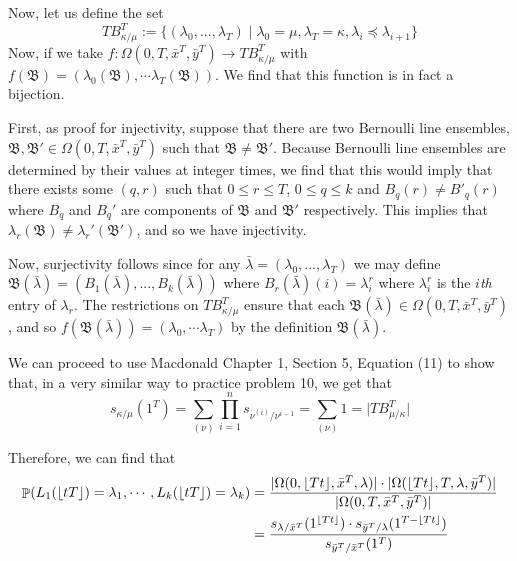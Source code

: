 \documentclass[12pt]{article}
\DeclareMathOperator{\pr}{\mathbb{P}}
\DeclarePairedDelimiter\floor{\lfloor}{\rfloor}
\begin{document}
Now, let us define the set 
\[TB_{\kappa/\mu}^T:=\{(\lambda_0,...,\lambda_T)\mid \lambda_0=\mu, \lambda_T=\kappa, \lambda_i\preceq\lambda_{i+1}\}\] 
Now, if we take $f:\Omega(0,T,\bar x^T, \bar y ^T)\to TB_{\kappa/\mu}^T$ with $f(\mathfrak{B})= (\lambda_0(\mathfrak{B}),\cdots \lambda_T(\mathfrak{B}))$. We find that this function is in fact a bijection. 

First, as proof for injectivity, suppose that there are two Bernoulli line ensembles, $\mathfrak{B}, \mathfrak{B}'\in \Omega(0,T,\bar x^T, \bar y ^T)$ such that $\mathfrak{B}\neq \mathfrak{B'}$.
Because Bernoulli line ensembles are determined by their values at integer times, we find that this would imply that there exists some $(q,r)$ such that $0\leq r\leq T$, $0\leq q \leq k$ and $B_q(r)\neq B'_q(r)$ where $B_q$ and $B_q'$ are components of $\mathfrak{B}$ and $\mathfrak{B'}$ respectively. 
This implies that $\lambda_r(\mathfrak B)\neq \lambda_r'(\mathfrak{B'})$, and so we have injectivity. 

Now, surjectivity follows since for any $\bar\lambda=(\lambda_0,...,\lambda_T)$ we may define $\mathfrak{B}(\bar{\lambda})=(B_1(\bar\lambda),...,B_k(\bar\lambda))$ where $B_r(\bar\lambda)(i)=\lambda_i^r$ where $\lambda_i^r$ is the $i$\textit{th} entry of $\lambda_r$. The restrictions on $TB_{\kappa/\mu}^T$ ensure that each $\mathfrak{B}(\bar\lambda)\in \Omega(0,T,\bar x^T,\bar y^T)$, and so $f(\mathfrak B(\bar{\lambda}))=(\lambda_0,\cdots \lambda_T)$ by the definition $\mathfrak{B}(\bar\lambda)$. 

We can proceed to use Macdonald Chapter 1, Section 5, Equation (11) to show that, in a very similar way to practice problem 10, we get that 
\[s_{\kappa/\mu}(1^T)=\sum_{(\nu)}\prod_{i=1}^n s_{\nu^{(i)}/\nu^{i-1}}=\sum_{(\nu)} 1=\lvert TB_{\mu/\kappa}^T\rvert\]

Therefore, we can find that 
\begin{align*}
\pr(L_1(\lfloor tT\rfloor)=\lambda_1,\cdots, L_k(\lfloor tT\rfloor)=\lambda_k)
&=\frac{\lvert \Omega(0,\lfloor Tt\rfloor, \bar x^T, \lambda)\rvert\cdot \lvert \Omega(\lfloor Tt\rfloor ,T, \lambda, \bar y^T)\rvert}{\lvert \Omega(0, T, \bar x^T, \bar y^T)\rvert}\\
&=\frac{s_{\lambda/\bar x^T}(1^{\floor{Tt}})\cdot s_{\bar y^T/\lambda}(1^{T-\floor{Tt}})}{s_{\bar y^T/\bar x^T}(1^T)}
\end{align*}
\end{document}
